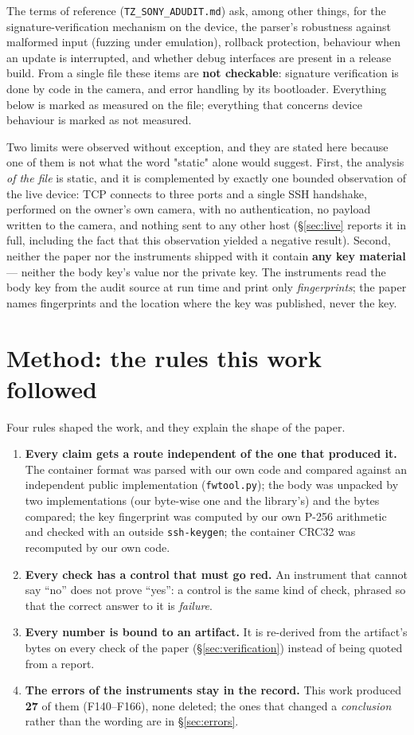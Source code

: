 \documentclass[12pt]{article}
\newcommand{\code}[1]{\texttt{\small #1}}
\begin{document}
The terms of reference (\code{TZ\_SONY\_ADUDIT.md}) ask, among other things, for the
signature-verification mechanism on the device, the parser's robustness against malformed
input (fuzzing under emulation), rollback protection, behaviour when an update is interrupted,
and whether debug interfaces are present in a release build. From a single file these items
are \textbf{not checkable}: signature verification is done by code in the camera, and error
handling by its bootloader. Everything below is marked as measured on the file; everything
that concerns device behaviour is marked as not measured.

Two limits were observed without exception, and they are stated here because one of them is
not what the word "static" alone would suggest. First, the analysis \emph{of the file} is
static, and it is complemented by exactly one bounded observation of the live device: TCP
connects to three ports and a single SSH handshake, performed on the owner's own camera, with
no authentication, no payload written to the camera, and nothing sent to any other host
(\S\ref{sec:live} reports it in full, including the fact that this observation yielded a
negative result). Second, neither the
paper nor the instruments shipped with it contain \textbf{any key material} --- neither the
body key's value nor the private key. The instruments read the body key from the audit source
at run time and print only \emph{fingerprints}; the paper names fingerprints and the location
where the key was published, never the key.

\section{Method: the rules this work followed}
\label{sec:method}

Four rules shaped the work, and they explain the shape of the paper.

\begin{enumerate}
\item \textbf{Every claim gets a route independent of the one that produced it.} The container
format was parsed with our own code and compared against an independent public implementation
(\code{fwtool.py}); the body was unpacked by two implementations (our byte-wise one and the
library's) and the bytes compared; the key fingerprint was computed by our own P-256
arithmetic and checked with an outside \code{ssh-keygen}; the container CRC32 was recomputed
by our own code.
\item \textbf{Every check has a control that must go red.} An instrument that cannot say
``no'' does not prove ``yes'': a control is the same kind of check, phrased so that the
correct answer to it is \emph{failure}.
\item \textbf{Every number is bound to an artifact.} It is re-derived from the artifact's
bytes on every check of the paper (\S\ref{sec:verification}) instead of being quoted from a
report.
\item \textbf{The errors of the instruments stay in the record.} This work produced
\textbf{27} of them (F140--F166), none deleted; the ones that changed a \emph{conclusion}
rather than the wording are in \S\ref{sec:errors}.
\end{enumerate}
\end{document}
